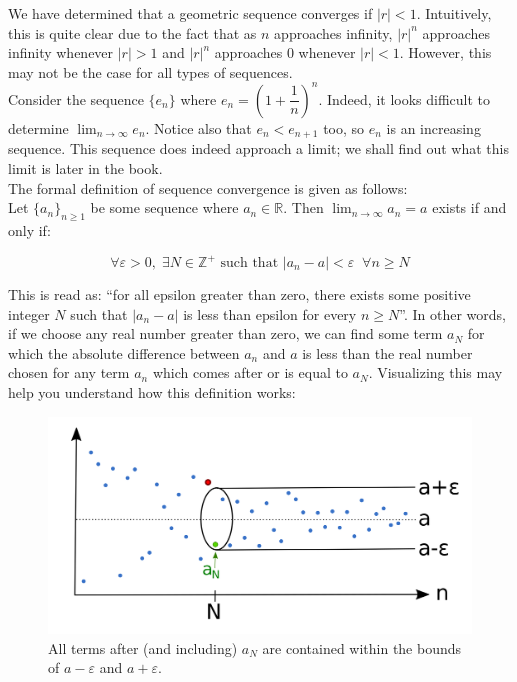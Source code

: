 \documentclass[12pt, a4paper, titlepage, twoside]{article}
\newcommand*{\Z}{\mathbb{Z}}
\newcommand*{\R}{\mathbb{R}}
\begin{document}
	\begin{fr}
		We have determined that a geometric sequence converges if $|r| < 1$. Intuitively, this is quite clear due to the fact that
		as $n$ approaches infinity, $|r|^n$ approaches infinity whenever $|r| > 1$ and $|r|^n$ approaches 0 whenever $|r| < 1$.
		However, this may not be the case for all types of sequences.\\
		
		Consider the sequence $\{e_n\}$ where $e_n = \left(1 + \dfrac{1}{n}\right)^n$. Indeed, it looks difficult to determine $\displaystyle
		\lim_{n \to \infty} e_n$. Notice also that $e_n < e_{n+1}$ too, so $e_n$ is an increasing sequence. This sequence does indeed
		approach a limit; we shall find out what this limit is later in the book.\\
		
		The formal definition of sequence convergence is given as follows:\\
		
		Let $\{a_n\}_{n \geqslant 1}$ be some sequence where $a_n \in \R$. Then $\displaystyle \lim_{n \to \infty} a_n = a$ exists if and only if:
		
		$$\forall \varepsilon > 0, \; \exists N \in \Z^+ \text{ such that } |a_n - a| < \varepsilon \; \; \forall n \geqslant N$$

		\hfill		
		
		This is read as: ``for all epsilon greater than zero, there exists some positive integer $N$ such that $|a_n - a|$ is less
		than epsilon for every $n \geqslant N$''. In other words, if we choose any real number greater than zero, we can find some
		term $a_N$ for which the absolute difference between $a_n$ and $a$ is less than the real number chosen for any term $a_n$
		which comes after or is equal to $a_N$. Visualizing this may help you understand how this definition works:\\
		
		\begin{figure}[H]
			\centering
			\includegraphics[width=12cm]{conv-seq.png}
			\caption*{All terms after (and including) $a_N$ are contained within the bounds of $a-\varepsilon$ and $a+\varepsilon$.}
		\end{figure}
	\end{fr}
	
\end{document}
